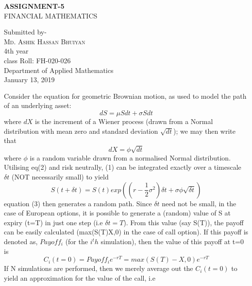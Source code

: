 \documentclass[14pt,a4paper]{article}
\begin{document}
	\begin{titlepage}
	\begin{center}
	\Huge{\bfseries ASSIGNMENT-5}\\
	[5mm]
	\Large{FINANCIAL MATHEMATICS}\\
	[15cm]
	\end{center}
	
	\begin{flushright}
	Submitted by-\\
	[2mm]	
	\textsc{\Large Md. Ashik Hassan Bhuiyan}\\
	[0.1cm]	
	4th year\\
	class Roll: FH-020-026\\
	Department of Applied Mathematics\\
	January 13, 2019\\
	\end{flushright}
	\end{titlepage}
	\noindent Consider the equation for geometric Brownian motion, as used to model the path of an underlying asset: 
\begin{equation}
dS=\mu Sdt+\sigma Sdt
\end{equation}		
where $dX$ is the increment of a Wiener process (drawn from a Normal distribution with mean zero and standard deviation $\sqrt{dt}$); we may then write that
\begin{equation}
dX=\phi \sqrt{dt}
\end{equation}
	where $\phi$ is a random variable drawn from a normalised Normal distribution. Utilising eq(2) and risk neutrally, (1) can be integrated exactly over a timescale $\delta t$ (NOT necessarily small) to yield 
	\begin{equation}
	S(t+\delta t) = S(t) exp((r-\frac{1}{2}\sigma^2)\delta t+\sigma \phi \sqrt{\delta t})
	\end{equation}
	equation (3) then generates a random path. Since $\delta t$ need not be small, in the case of European options, it is possible to generate a (random) value of S at expiry (t=T) in just one step (i.e $\delta t=T$). From this value (say S(T)), the payoff can be easily calculated  (max(S(T)X,0) in the case of call option). If this payoff is denoted as, $Payoff_i$ (for the $i^th$ simulation), then the value of this payoff at t=0 is 
	\begin{equation}
	C_i(t=0)=Payoff_i{e^{-rT}}=max(S(T)-X,0)e^{-rT}
	\end{equation}
	If N simulations are performed, then we merely average out the $C_i(t=0)$ to yield  an approximation for the value of the call, i.e\\
\end{document}
